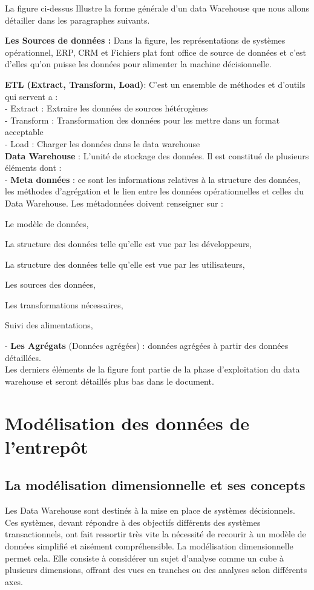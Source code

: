 La figure ci-dessus Illustre la forme générale d’un data Warehouse que nous allons détailler dans les paragraphes suivants.

\textbf{Les Sources de données :} Dans la figure, les représentations de systèmes opérationnel, ERP, CRM et Fichiers plat font office de source de données et c’est d’elles qu’on puisse les données pour alimenter la machine décisionnelle.

\textbf{ETL (Extract, Transform, Load)}: C’est un ensemble de méthodes et d’outils qui servent a :\\
-	Extract : Extraire les données de sources hétérogènes\\
-	Transform : Transformation des données pour les mettre dans un format acceptable\\
-	Load : Charger les données dans le data warehouse\\

\textbf{Data Warehouse} : L’unité de stockage des données. Il est constitué de plusieurs éléments dont :\\ 
-	\textbf{Meta données} : ce sont les informations relatives à la structure des données, les méthodes d’agrégation et le lien entre les données opérationnelles et celles du Data Warehouse. Les métadonnées doivent renseigner sur :
 \begin{description}
 \item Le modèle de données,
 \item La structure des données telle qu’elle est vue par les développeurs,
 \item La structure des données telle qu’elle est vue par les utilisateurs,
 \item Les sources des données,
 \item Les transformations nécessaires,
 \item Suivi des alimentations,
 \end{description}
-	\textbf{Les Agrégats} (Données agrégées) : données agrégées à partir des données détaillées.\\

Les derniers éléments de la figure font partie de la phase d’exploitation du data warehouse et seront détaillés plus bas dans le document.


\section{Modélisation des données de l’entrepôt}

 \subsection{La modélisation dimensionnelle et ses concepts}
 	Les Data Warehouse sont destinés à la mise en place de systèmes décisionnels. Ces systèmes, devant répondre à des objectifs différents des systèmes transactionnels, ont fait ressortir très vite la nécessité de recourir à un modèle de données simplifié et aisément compréhensible. La modélisation dimensionnelle permet cela. Elle consiste à considérer un sujet d’analyse comme un cube à plusieurs dimensions, offrant des vues en tranches ou des analyses selon différents axes.
 	
